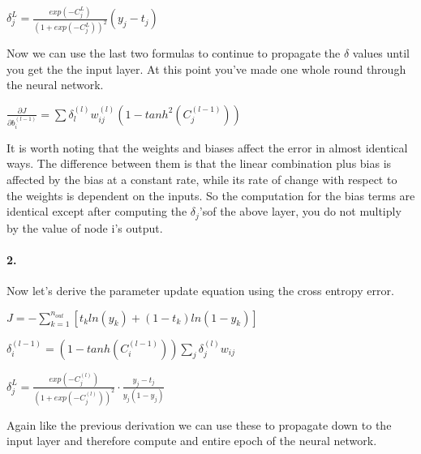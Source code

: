 \documentclass[12pt]{article}
\begin{document}
$ \delta_j^L = \frac{exp(-C_j^L)}{(1 + exp(-C_j^L))^2}(y_j - t_j)
$

Now we can use the last two formulas to continue to propagate the $\delta$ values until you get the the input layer. At this point you've made one whole round through the neural network.

$\frac{\partial J}{\partial b_i^{(l-1)}} = \sum
\delta_l^{(l)} w_{ij}^{(l)}(1 - tanh^2(C_j^{(l-1)}))
$

It is worth noting that the weights and biases affect the error in almost identical ways.
The difference between them is that the linear combination plus bias is affected by the bias at a constant rate, while its rate of change with respect to the weights is dependent on the inputs. 
So the computation for the bias terms are identical except after computing the $\delta_j$'sof the above layer, you do not multiply by the value of node i's output.

\paragraph{2.}

Now let's derive the parameter update equation using the cross entropy error.

$J = - \sum\limits_{k=1}^{n_{out}} [t_k ln(y_k) + (1 - t_k)ln(1-y_k)]$

$\delta_i^{(l-1)} = (1-tanh(C_i^{(l-1)}))
\sum \limits_j \delta_j^{(l)}w_{ij}
$

$\delta_j^L = \frac{exp(-C_j^{(l)})}{(1 + exp(-C_j^{(l)}))^2}
\cdot \frac{y_j - t_j}{y_j(1 - y_j)}
$

Again like the previous derivation we can use these to propagate down to the input layer and therefore compute and entire epoch of the neural network.
\end{document}

